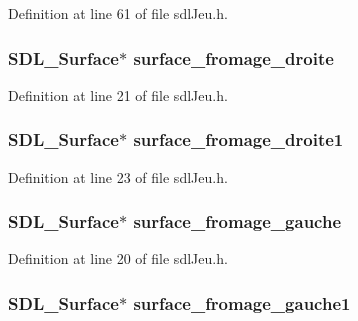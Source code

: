 Definition at line 61 of file sdl\-Jeu.\-h.

\hypertarget{structsdl_jeu_a7c6ef35a42794f835aa8b46035ee47fa}{
\subsubsection[{surface\-\_\-fromage\-\_\-droite}]{\setlength{\rightskip}{0pt plus 5cm}S\-D\-L\-\_\-\-Surface$\ast$ surface\-\_\-fromage\-\_\-droite}}\label{structsdl_jeu_a7c6ef35a42794f835aa8b46035ee47fa}


Definition at line 21 of file sdl\-Jeu.\-h.

\hypertarget{structsdl_jeu_a71c9d3841b956efd1679703045750d21}{
\subsubsection[{surface\-\_\-fromage\-\_\-droite1}]{\setlength{\rightskip}{0pt plus 5cm}S\-D\-L\-\_\-\-Surface$\ast$ surface\-\_\-fromage\-\_\-droite1}}\label{structsdl_jeu_a71c9d3841b956efd1679703045750d21}


Definition at line 23 of file sdl\-Jeu.\-h.

\hypertarget{structsdl_jeu_afd00ed4bfd7c3861399353daf3448bdf}{
\subsubsection[{surface\-\_\-fromage\-\_\-gauche}]{\setlength{\rightskip}{0pt plus 5cm}S\-D\-L\-\_\-\-Surface$\ast$ surface\-\_\-fromage\-\_\-gauche}}\label{structsdl_jeu_afd00ed4bfd7c3861399353daf3448bdf}


Definition at line 20 of file sdl\-Jeu.\-h.

\hypertarget{structsdl_jeu_adfb16227a11193bf81b7781d3e39589a}{
\subsubsection[{surface\-\_\-fromage\-\_\-gauche1}]{\setlength{\rightskip}{0pt plus 5cm}S\-D\-L\-\_\-\-Surface$\ast$ surface\-\_\-fromage\-\_\-gauche1}}\label{structsdl_jeu_adfb16227a11193bf81b7781d3e39589a}


